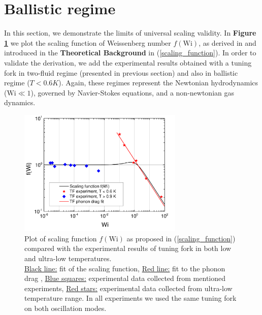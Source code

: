 \section{Ballistic regime}

In this section, we demonstrate the limits of universal scaling validity. In \textbf{Figure \ref{ballistic}} we plot the scaling function of Weissenberg number $f(\text{Wi})$, as derived in \cite{scaling_function} and introduced in the \textbf{Theoretical Background} in (\ref{scaling_function}). In order to validate the derivation, we add the experimental results obtained with a tuning fork in two-fluid regime (presented in previous section) and also in ballistic regime ($T < 0.6\unit{K}$).
Again, these regimes represent the Newtonian hydrodynamics ($\text{Wi} \ll 1$), governed by Navier-Stokes equations, and a non-newtonian gas dynamics. \cite{universal_scaling}

\begin{figure}[h]
	\centering
	\includegraphics[width=0.7\textwidth]{graphics/results/ballistic_regime}
	\caption{Plot of scaling function $f(\text{Wi})$ as proposed in (\ref{scaling_function}) compared with the experimental results of tuning fork in both low and ultra-low temperatures.\\
	\underline{Black line:} fit of the scaling function, \underline{Red line:} fit to the phonon drag \cite{universal_scaling} , \underline{Blue squares:} experimental data collected from mentioned experiments, \underline{Red stars:} experimental data collected from ultra-low temperature range. In all experiments we used the same tuning fork on both oscillation modes.}
	\label{ballistic}
\end{figure}

